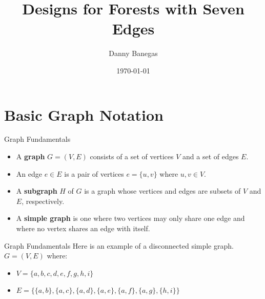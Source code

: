 \documentclass{beamer}
\title{Designs for Forests with Seven Edges}
\author{Danny Banegas}
\institute{University of Minnesota: Duluth}
\date{\today}
\theoremstyle{plain}
\begin{document}
\frame{\titlepage}

\section{Basic Graph Notation}
\begin{frame}{Graph Fundamentals}
    \begin{itemize}
        \pause
        \item A \textbf{graph} $G = (V, E)$ consists of a set of vertices $V$ and a set of edges $E$.
        \pause
        \item An edge $e \in E$ is a pair of vertices $e = \{u, v\}$ where $u, v \in V$.
        \pause
        \item A \textbf{subgraph} $H$ of $G$ is a graph whose vertices and edges are subsets of $V$ and $E$, respectively.
        \pause
        \item A \textbf{simple graph} is one where two vertices may only share one edge and where no vertex shares an edge with itself.
        
    \end{itemize}
\end{frame}

\begin{frame}{Graph Fundamentals}
    Here is an example of a disconnected simple graph. $G = (V, E)$ where:
    \pause
    \begin{itemize}
        \item $V = \{a, b, c, d, e, f, g, h, i\}$
        \pause
        \item $E = \{\{a, b\}, \{a, c\}, \{a, d\}, \{a, e\}, \{a, f\}, \{a, g\},\{h,i\}\}$
    \end{itemize}
    \pause
    \begin{center}
    \end{center}
\end{frame}
\end{document}
